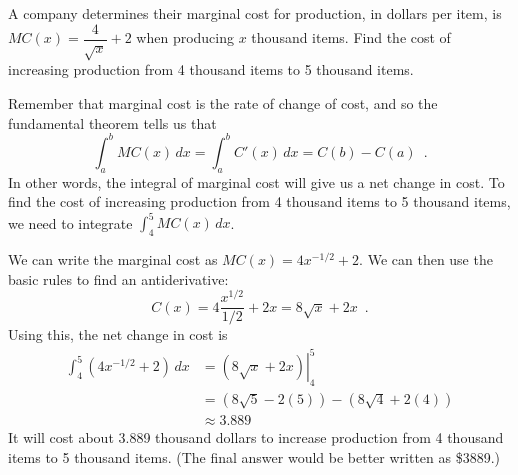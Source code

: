 \begin{example}
A company determines their marginal cost for production, in dollars per item, is $MC(x)=\dfrac{4}{\sqrt{x}}+2$ when producing $x$ thousand items. Find the cost of increasing production from 4 thousand items to 5 thousand items.

\begin{solution}
  Remember that marginal cost is the rate of change of cost, and so the fundamental theorem tells us that
  $$\int_a^b MC(x)\, dx = \int_a^b C'(x)\, dx =C(b)-C(a) \enspace .$$
  In other words, the integral of marginal cost will give us a net change in cost. To find the cost of increasing production from 4 thousand items to 5 thousand items, we need to integrate $\displaystyle\int_4^5 MC(x)\, dx$.

We can write the marginal cost as $MC(x)=4x^{-1/2}+2$. We can then use the basic rules to find an antiderivative:
$$C(x) = 4\frac{x^{1/2}}{1/2} + 2x = 8\sqrt{x} + 2x\enspace .$$
Using this, the net change in cost is
\begin{align*}
  \int_4^5\left(4x^{-1/2}+2\right)\, dx &= \left.\left(8\sqrt{x} + 2x\right)\right|_4^5 \\
  &= (8\sqrt{5} - 2(5)) - (8\sqrt{4} +2(4))\\
  &\approx 3.889
\end{align*}
It will cost about 3.889 thousand dollars to increase production from 4 thousand items to 5 thousand items. (The final answer would be better written as \$3889.)
\end{solution}\end{example}
